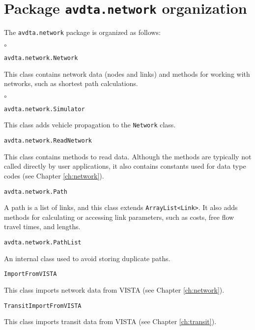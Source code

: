 \section{Package \texttt{avdta.network} organization}
The \texttt{avdta.network} package is organized as follows:
\begin{list}{$\circ$}{}
	\item \texttt{avdta.network.Network}
	
	This class contains network data (nodes and links) and methods for working with networks, such as shortest path calculations.
	
	\begin{list}{$\circ$}{}
		\item \texttt{avdta.network.Simulator}
		
		This class adds vehicle propagation to the \texttt{Network} class.
	\end{list}

	\item \texttt{avdta.network.ReadNetwork}
	
	This class contains methods to read data. Although the methods are typically not called directly by user applications, it also contains constants used for data type codes (see Chapter \ref{ch:network}).
	
	\item \texttt{avdta.network.Path}
	
	A path is a list of links, and this class  extends \texttt{ArrayList<Link>}. It also adds methods for calculating or accessing link parameters, such as costs, free flow travel times, and lengths.
	
	\item\texttt{avdta.network.PathList}
	
	An internal class used to avoid storing duplicate paths.
	
	\item \texttt{ImportFromVISTA}
	
	This class imports network data from VISTA (see Chapter \ref{ch:network}).
	
	\item \texttt{TransitImportFromVISTA}
	
	This class imports transit data from VISTA (see Chapter \ref{ch:transit}).
	
\end{list}


